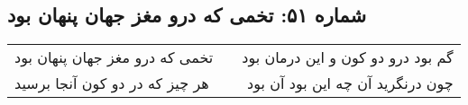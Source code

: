 \begin{center}
\section*{شماره ۵۱: تخمی که درو مغز جهان پنهان بود}
\label{sec:051}
\begin{longtable}{l p{0.5cm} r}
تخمی که درو مغز جهان پنهان بود
&&
گم بود درو دو کون و این درمان بود
\\
هر چیز که در دو کون آنجا برسید
&&
چون درنگرید آن چه این بود آن بود
\\
\end{longtable}
\end{center}

